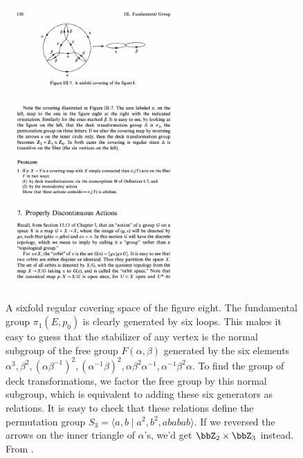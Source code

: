 \begin{figure}
    \centering
    \includegraphics[width=0.6\textwidth]{figures/sixfold.pdf}
    \caption{A sixfold regular covering space of the figure eight. The fundamental group $\pi_1(E,p_0)$ is clearly generated by six loops. This makes it easy to guess that the stabilizer of any vertex is the normal subgroup of the free group $F(\alpha,\beta)$ generated by the six elements $\alpha^3,\beta^2,\left(\alpha\beta^{-1}\right)^2, \left(\alpha^{-1}\beta\right)^2, \alpha\beta^2\alpha^{-1}, \alpha^{-1}\beta^2\alpha$. To find the group of deck transformations, we factor the free group by this normal subgroup, which is equivalent to adding these six generators as relations. It is easy to check that these relations define the permutation group $S_3=\langle a,b\mid a^2,b^2,ababab\rangle$. If we reversed the arrows on the inner triangle of $\alpha$'s, we'd get $\bbZ_2\times \bbZ_3$ instead. From \cite[Fig.~III-7]{Bredon}.}
    \label{fig:sixfold covering}
\end{figure}

